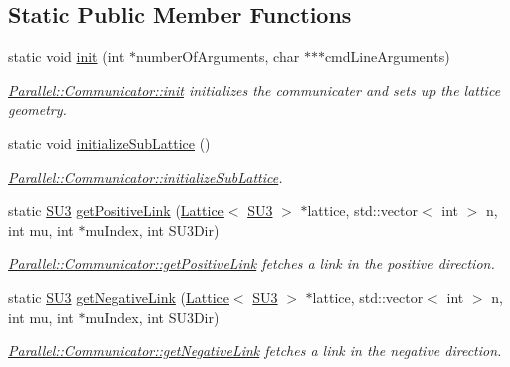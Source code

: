 \subsection*{Static Public Member Functions}
\begin{DoxyCompactItemize}
\item 
static void \mbox{\hyperlink{class_parallel_1_1_communicator_a4ed2a77c33cd899b31131e44fc906fd7}{init}} (int $\ast$number\+Of\+Arguments, char $\ast$$\ast$$\ast$cmd\+Line\+Arguments)
\begin{DoxyCompactList}\small\item\em \mbox{\hyperlink{class_parallel_1_1_communicator_a4ed2a77c33cd899b31131e44fc906fd7}{Parallel\+::\+Communicator\+::init}} initializes the communicater and sets up the lattice geometry. \end{DoxyCompactList}\item 
static void \mbox{\hyperlink{class_parallel_1_1_communicator_a3094d713d09225738ecf0250019db115}{initialize\+Sub\+Lattice}} ()
\begin{DoxyCompactList}\small\item\em \mbox{\hyperlink{class_parallel_1_1_communicator_a3094d713d09225738ecf0250019db115}{Parallel\+::\+Communicator\+::initialize\+Sub\+Lattice}}. \end{DoxyCompactList}\item 
static \mbox{\hyperlink{class_s_u3}{S\+U3}} \mbox{\hyperlink{class_parallel_1_1_communicator_a1c8d402df4a44becc1cab7a762f51432}{get\+Positive\+Link}} (\mbox{\hyperlink{class_lattice}{Lattice}}$<$ \mbox{\hyperlink{class_s_u3}{S\+U3}} $>$ $\ast$lattice, std\+::vector$<$ int $>$ n, int mu, int $\ast$mu\+Index, int S\+U3\+Dir)
\begin{DoxyCompactList}\small\item\em \mbox{\hyperlink{class_parallel_1_1_communicator_a1c8d402df4a44becc1cab7a762f51432}{Parallel\+::\+Communicator\+::get\+Positive\+Link}} fetches a link in the positive direction. \end{DoxyCompactList}\item 
static \mbox{\hyperlink{class_s_u3}{S\+U3}} \mbox{\hyperlink{class_parallel_1_1_communicator_ae843d16f4aed13d5b5179a05b717ec88}{get\+Negative\+Link}} (\mbox{\hyperlink{class_lattice}{Lattice}}$<$ \mbox{\hyperlink{class_s_u3}{S\+U3}} $>$ $\ast$lattice, std\+::vector$<$ int $>$ n, int mu, int $\ast$mu\+Index, int S\+U3\+Dir)
\begin{DoxyCompactList}\small\item\em \mbox{\hyperlink{class_parallel_1_1_communicator_ae843d16f4aed13d5b5179a05b717ec88}{Parallel\+::\+Communicator\+::get\+Negative\+Link}} fetches a link in the negative direction. \end{DoxyCompactList}\item 

\end{DoxyCompactItemize}
